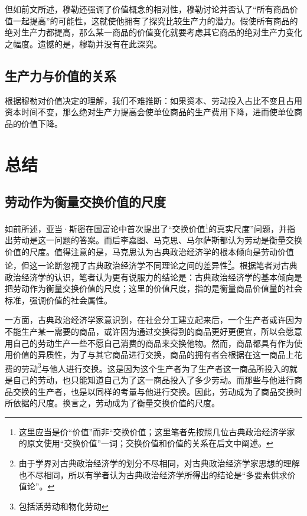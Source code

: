 但如前文所述，穆勒还强调了价值概念的相对性，穆勒讨论并否认了“所有商品价值一起提高”的可能性，这就使他拥有了探究比较生产力的潜力。假使所有商品的绝对生产力都提高，那么某一商品的价值变化就要考虑其它商品的绝对生产力变化之幅度。遗憾的是，穆勒并没有在此深究。

\subsection{生产力与价值的关系}

根据穆勒对价值决定的理解，我们不难推断：如果资本、劳动投入占比不变且占用资本时间不变，那么绝对生产力提高会使单位商品的生产费用下降，进而使单位商品的价值下降。

\section{总结}

\subsection{劳动作为衡量交换价值的尺度}

如前所述，亚当·斯密在国富论中首次提出了“交换价值\footnote{这里应当是价“价值”而非“交换价值；这里笔者先按照几位古典政治经济学家的原文使用“交换价值”一词；交换价值和价值的关系在后文中阐述。}的真实尺度”问题，并指出劳动是这一问题的答案。而后李嘉图、马克思、马尔萨斯都认为劳动是衡量交换价值的尺度。值得注意的是，马克思认为古典政治经济学的根本倾向是劳动价值论，但这一论断忽视了古典政治经济学不同理论之间的差异性\footnote{由于学界对古典政治经济学的划分不尽相同，对古典政治经济学家思想的理解也不尽相同，所以有学者认为古典政治经济学所得出的结论是“多要素供求价值论”\cite[179]{CaiJiMingCongGuDianZhengZhiJingJiXueDaoZhongGuoTeSeSheHuiZhuYiZhengZhiJingJiXueJiYuZhongGuoShiJiaoDeZhengZhiJingJiXueYanBianShangCe2023}。}。根据笔者对古典政治经济学的认识，笔者认为更有说服力的结论是：古典政治经济学的基本倾向是把劳动作为衡量交换价值的尺度；这里的价值尺度，指的是衡量商品价值量的社会标准，强调价值的社会属性。

一方面，古典政治经济学家意识到，在社会分工建立起来后，一个生产者或许因为不能生产某一需要的商品，或许因为通过交换得到的商品更好更便宜，所以会愿意用自己的劳动生产一些不愿自己消费的商品来交换他物。然而，商品都具有作为使用价值的异质性，为了与其它商品进行交换，商品的拥有者会根据在这一商品上花费的劳动\footnote{包括活劳动和物化劳动}与他人进行交换。这是因为这个生产者为了生产者这一商品所投入的就是自己的劳动，也只能知道自己为了这一商品投入了多少劳动。而那些与他进行商品交换的生产者，也是以同样的考量与他进行交换。因此，劳动成为了商品交换时所依据的尺度。换言之，劳动成为了衡量交换价值的尺度。\cite[1016-1017]{ZhongGongZhongYangMaKeSiEnGeSiLieNingSiDaLinZhuZuoBianYiJuMaKeSiEnGeSiWenJiDi7Juan2009}\cite[25]{YaDang*SiMiGuoFuLun2015}\cite[133]{MaErSaSiZhengZhiJingJiXueDingYi2023}


